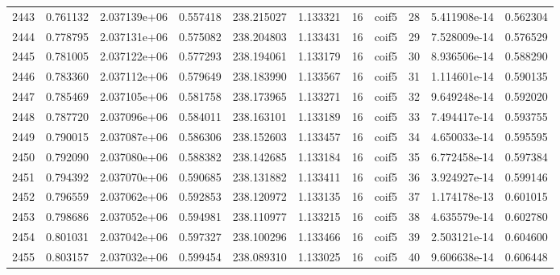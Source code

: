 \begin{tabular}{lrrrrrrlrrr}
2443 &    0.761132 &        2.037139e+06 &  0.557418 &              238.215027 &    1.133321 &      16 &        coif5 &     28 &   5.411908e-14 &      0.562304 \\
2444 &    0.778795 &        2.037131e+06 &  0.575082 &              238.204803 &    1.133431 &      16 &        coif5 &     29 &   7.528009e-14 &      0.576529 \\
2445 &    0.781005 &        2.037122e+06 &  0.577293 &              238.194061 &    1.133179 &      16 &        coif5 &     30 &   8.936506e-14 &      0.588290 \\
2446 &    0.783360 &        2.037112e+06 &  0.579649 &              238.183990 &    1.133567 &      16 &        coif5 &     31 &   1.114601e-14 &      0.590135 \\
2447 &    0.785469 &        2.037105e+06 &  0.581758 &              238.173965 &    1.133271 &      16 &        coif5 &     32 &   9.649248e-14 &      0.592020 \\
2448 &    0.787720 &        2.037096e+06 &  0.584011 &              238.163101 &    1.133189 &      16 &        coif5 &     33 &   7.494417e-14 &      0.593755 \\
2449 &    0.790015 &        2.037087e+06 &  0.586306 &              238.152603 &    1.133457 &      16 &        coif5 &     34 &   4.650033e-14 &      0.595595 \\
2450 &    0.792090 &        2.037080e+06 &  0.588382 &              238.142685 &    1.133184 &      16 &        coif5 &     35 &   6.772458e-14 &      0.597384 \\
2451 &    0.794392 &        2.037070e+06 &  0.590685 &              238.131882 &    1.133411 &      16 &        coif5 &     36 &   3.924927e-14 &      0.599146 \\
2452 &    0.796559 &        2.037062e+06 &  0.592853 &              238.120972 &    1.133135 &      16 &        coif5 &     37 &   1.174178e-13 &      0.601015 \\
2453 &    0.798686 &        2.037052e+06 &  0.594981 &              238.110977 &    1.133215 &      16 &        coif5 &     38 &   4.635579e-14 &      0.602780 \\
2454 &    0.801031 &        2.037042e+06 &  0.597327 &              238.100296 &    1.133466 &      16 &        coif5 &     39 &   2.503121e-14 &      0.604600 \\
2455 &    0.803157 &        2.037032e+06 &  0.599454 &              238.089310 &    1.133025 &      16 &        coif5 &     40 &   9.606638e-14 &      0.606448 \\

\end{tabular}
